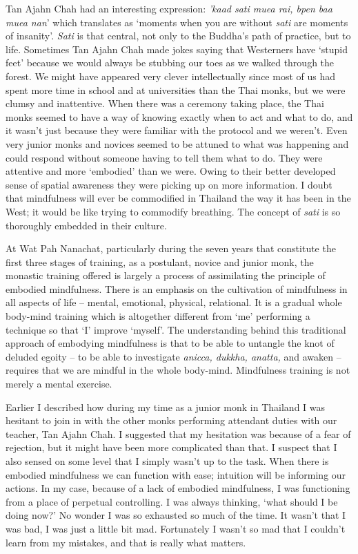 Tan Ajahn Chah had an interesting expression: \emph{'kaad sati muea rai,
bpen baa muea nan}' which translates as `moments when you are without
\emph{sati} are moments of insanity'. \emph{Sati} is that central, not
only to the Buddha's path of practice, but to life. Sometimes Tan Ajahn
Chah made jokes saying that Westerners have `stupid feet' because we
would always be stubbing our toes as we walked through the forest. We
might have appeared very clever intellectually since most of us had
spent more time in school and at universities than the Thai monks, but
we were clumsy and inattentive. When there was a ceremony taking place,
the Thai monks seemed to have a way of knowing exactly when to act and
what to do, and it wasn't just because they were familiar with the
protocol and we weren't. Even very junior monks and novices seemed to be
attuned to what was happening and could respond without someone having
to tell them what to do. They were attentive and more `embodied' than we
were. Owing to their better developed sense of spatial awareness they
were picking up on more information. I doubt that mindfulness will ever
be commodified in Thailand the way it has been in the West; it would be
like trying to commodify breathing. The concept of \emph{sati} is so
thoroughly embedded in their culture.

At Wat Pah Nanachat, particularly during the seven years that constitute
the first three stages of training, as a postulant, novice and junior
monk, the monastic training offered is largely a process of assimilating
the principle of embodied mindfulness. There is an emphasis on the
cultivation of mindfulness in all aspects of life -- mental, emotional,
physical, relational. It is a gradual whole body-mind training which is
altogether different from `me' performing a technique so that `I'
improve `myself'. The understanding behind this traditional approach of
embodying mindfulness is that to be able to untangle the knot of deluded
egoity -- to be able to investigate \emph{anicca, dukkha, anatta,} and
awaken -- requires that we are mindful in the whole body-mind.
Mindfulness training is not merely a mental exercise.

Earlier I described how during my time as a junior monk in Thailand I
was hesitant to join in with the other monks performing attendant duties
with our teacher, Tan Ajahn Chah. I suggested that my hesitation was
because of a fear of rejection, but it might have been more complicated
than that. I suspect that I also sensed on some level that I simply
wasn't up to the task. When there is embodied mindfulness we can
function with ease; intuition will be informing our actions. In my case,
because of a lack of embodied mindfulness, I was functioning from a
place of perpetual controlling. I was always thinking, `what should I be
doing now?' No wonder I was so exhausted so much of the time. It wasn't
that I was bad, I was just a little bit mad. Fortunately I wasn't so mad
that I couldn't learn from my mistakes, and that is really what matters.

